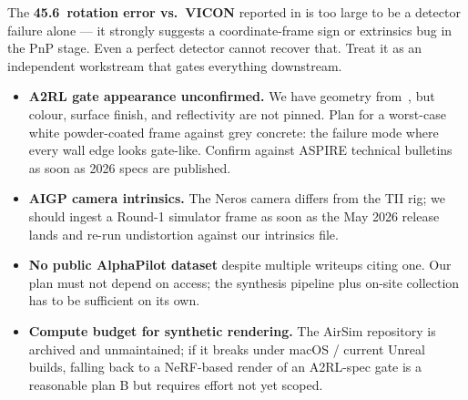 \documentclass[11pt,a4paper]{article}
\providecommand{\degree}{\textdegree}
\DeclareRobustCommand{\code}[1]{\codeurl{#1}}
\begin{document}
\begin{tcolorbox}[risk, title={Highest-priority risk: fix before any dataset work shows up in pose accuracy}]
The \textbf{45.6\degree\ rotation error vs.\ VICON} reported in \code{README.md:38--42} is too large to be a detector failure alone --- it strongly suggests a coordinate-frame sign or extrinsics bug in the PnP stage. Even a perfect detector cannot recover that. Treat it as an independent workstream that gates everything downstream.
\end{tcolorbox}

\begin{itemize}
  \item \textbf{A2RL gate appearance unconfirmed.} We have geometry from~\cite{bahnam2026monorace}, but colour, surface finish, and reflectivity are not pinned. Plan for a worst-case white powder-coated frame against grey concrete: the failure mode where every wall edge looks gate-like. Confirm against ASPIRE technical bulletins as soon as 2026 specs are published.
  \item \textbf{AIGP camera intrinsics.} The Neros camera differs from the TII rig; we should ingest a Round-1 simulator frame as soon as the May 2026 release lands and re-run undistortion against our intrinsics file.
  \item \textbf{No public AlphaPilot dataset} despite multiple writeups citing one. Our plan must not depend on access; the synthesis pipeline plus on-site collection has to be sufficient on its own.
  \item \textbf{Compute budget for synthetic rendering.} The AirSim repository is archived and unmaintained; if it breaks under macOS / current Unreal builds, falling back to a NeRF-based render of an A2RL-spec gate is a reasonable plan B but requires effort not yet scoped.
\end{itemize}

\printbibliography[heading=bibnumbered,title={References}]
\end{document}
